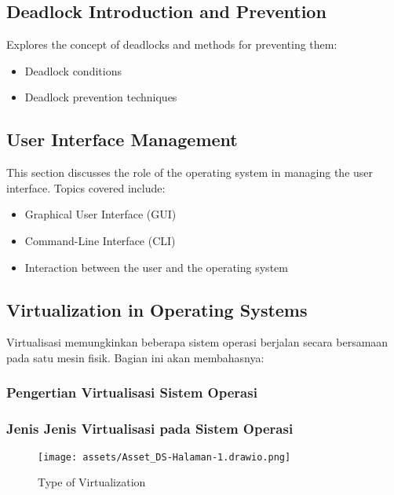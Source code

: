 \documentclass[12pt]{article}
\begin{document}
\subsection{Deadlock Introduction and Prevention}
Explores the concept of deadlocks and methods for preventing them:
\begin{itemize}
    \item Deadlock conditions
    \item Deadlock prevention techniques
\end{itemize}

\subsection{User Interface Management}
This section discusses the role of the operating system in managing the user interface. Topics covered include:
\begin{itemize}
    \item Graphical User Interface (GUI)
    \item Command-Line Interface (CLI)
    \item Interaction between the user and the operating system
\end{itemize}

\subsection{Virtualization in Operating Systems}
    Virtualisasi memungkinkan beberapa sistem operasi berjalan secara bersamaan pada satu mesin fisik. Bagian ini akan membahasnya:
    
\subsubsection{Pengertian Virtualisasi Sistem Operasi}

\subsubsection{Jenis Jenis Virtualisasi pada Sistem Operasi}

\begin{figure}[h!]
    \centering
    \texttt{[image: assets/Asset\_DS-Halaman-1.drawio.png]}
    \caption{Type of Virtualization}
\end{figure}
\end{document}
